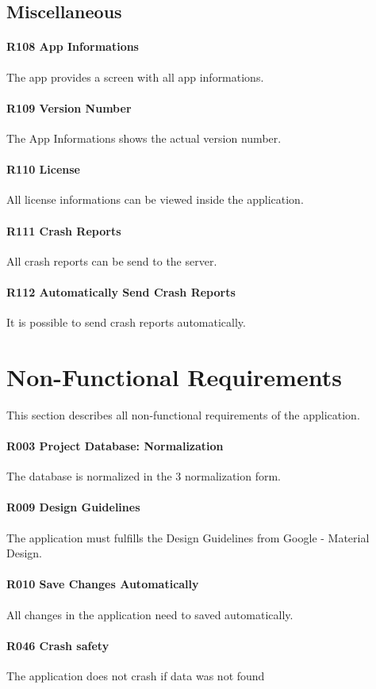 \subsection{Miscellaneous}
\paragraph{R108 App Informations}
The app provides a screen with all app informations.
\paragraph{R109 Version Number}
The App Informations shows the actual version number.
\paragraph{R110 License}
All license informations can be viewed inside the application.
\paragraph{R111 Crash Reports}
All crash reports can be send to the server.
\paragraph{R112 Automatically Send Crash Reports}
It is possible to send crash reports automatically.

\section{Non-Functional Requirements}
This section describes all non-functional requirements of the application.
\paragraph{R003 Project Database: Normalization}
The database is normalized in the 3 normalization form.
\paragraph{R009 Design Guidelines}
The application must fulfills the Design Guidelines from Google - Material Design.
\paragraph{R010 Save Changes Automatically}
All changes in the application need to saved automatically.
\paragraph{R046 Crash safety}
The application does not crash if data was not found
